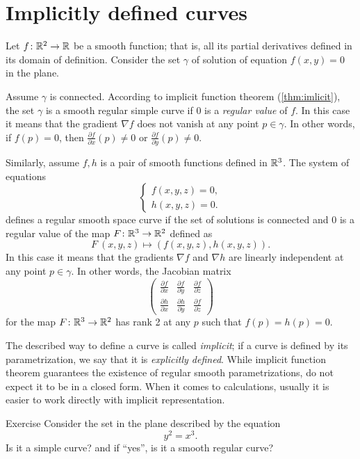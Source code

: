 \section*{Implicitly defined curves}

Let $f\colon\mathbb{R}^2\to \mathbb{R}$ be a smooth function; 
that is, all its partial derivatives defined in its domain of definition.
Consider the set $\gamma$ of solution of equation $f(x,y)=0$ in the plane.

Assume $\gamma$ is connected.
According to implicit function theorem (\ref{thm:imlicit}), the set $\gamma$ is a smooth regular simple curve if $0$ is a \emph{regular value} of $f$.
In this case it means that the gradient $\nabla f$ does not vanish at any point $p\in \gamma$.
In other words, if $f(p)=0$, then  $\tfrac{\partial f}{\partial x}(p)\ne 0$ or $\tfrac{\partial f}{\partial y}(p)\ne 0$.

Similarly, assume $f,h$ is a pair of smooth functions defined in $\mathbb{R}^3$.
The system of equations
\[\begin{cases}
   f(x,y,z)=0,
   \\
   h(x,y,z)=0.
  \end{cases}
\]
defines a regular smooth space curve if the set of solutions is connected and $0$ is a regular value of the map $F\colon\mathbb{R}^3\to\mathbb{R}^2$ defined as
\[F\:(x,y,z)\mapsto (f(x,y,z),h(x,y,z)).\]
In this case it means that the gradients $\nabla f$ and $\nabla h$ are linearly independent at any point $p\in \gamma$.
In other words, the Jacobian matrix
\[
\begin{pmatrix}
\tfrac{\partial f}{\partial x}&\tfrac{\partial f}{\partial y}&\tfrac{\partial f}{\partial z}\\
\tfrac{\partial h}{\partial x}&\tfrac{\partial h}{\partial y}&\tfrac{\partial f}{\partial z}
\end{pmatrix}
\]
for the map $F\colon\mathbb{R}^3\to\mathbb{R}^2$ has rank 2 at any $p$ such that $f(p)=h(p)=0$.

The described way to define a curve is called \emph{implicit};
if a curve is defined by its parametrization, we say that it is \emph{explicitly defined}.
While implicit function theorem guarantees the existence of regular smooth parametrizations, do not expect it to be in a closed form. 
When it comes to calculations, usually it is easier to work directly with implicit representation. 

\begin{thm}{Exercise}
Consider the set in the plane described by the equation
\[y^2=x^3.\]
Is it a simple curve? and if ``yes'', is it a smooth regular curve?
\end{thm}

